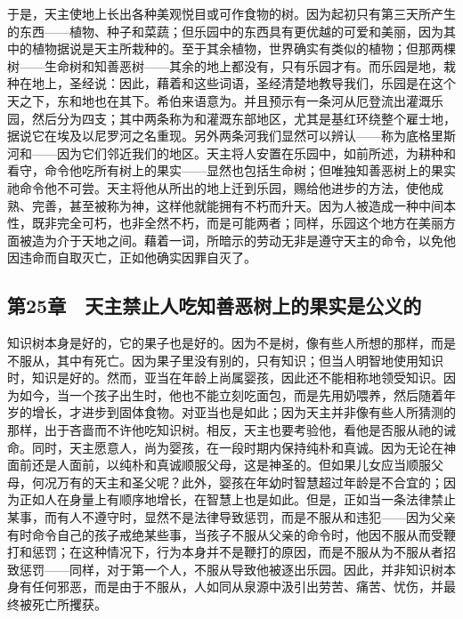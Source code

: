 于是，天主使地上长出各种美观悦目或可作食物的树。因为起初只有第三天所产生的东西——植物、种子和菜蔬；但乐园中的东西具有更优越的可爱和美丽，因为其中的植物据说是天主所栽种的。至于其余植物，世界确实有类似的植物；但那两棵树——生命树和知善恶树——其余的地上都没有，只有乐园才有。而乐园是地，栽种在地上，圣经说：因此，藉着和这些词语，圣经清楚地教导我们，乐园是在这个天之下，东和地也在其下。希伯来语意为。并且预示有一条河从厄登流出灌溉乐园，然后分为四支；其中两条称为和灌溉东部地区，尤其是基红环绕整个雇士地，据说它在埃及以尼罗河之名重现。另外两条河我们显然可以辨认——称为底格里斯河和——因为它们邻近我们的地区。天主将人安置在乐园中，如前所述，为耕种和看守，命令他吃所有树上的果实——显然也包括生命树；但唯独知善恶树上的果实祂命令他不可尝。天主将他从所出的地上迁到乐园，赐给他进步的方法，使他成熟、完善，甚至被称为神，这样他就能拥有不朽而升天。因为人被造成一种中间本性，既非完全可朽，也非全然不朽，而是可能两者；同样，乐园这个地方在美丽方面被造为介于天地之间。藉着一词，所暗示的劳动无非是遵守天主的命令，以免他因违命而自取灭亡，正如他确实因罪自灭了。\par


\subsection{第25章　天主禁止人吃知善恶树上的果实是公义的}

知识树本身是好的，它的果子也是好的。因为不是树，像有些人所想的那样，而是不服从，其中有死亡。因为果子里没有别的，只有知识；但当人明智地使用知识时，知识是好的。然而，亚当在年龄上尚属婴孩，因此还不能相称地领受知识。因为如今，当一个孩子出生时，他也不能立刻吃面包，而是先用奶喂养，然后随着年岁的增长，才进步到固体食物。对亚当也是如此；因为天主并非像有些人所猜测的那样，出于吝啬而不许他吃知识树。相反，天主也要考验他，看他是否服从祂的诫命。同时，天主愿意人，尚为婴孩，在一段时期内保持纯朴和真诚。因为无论在神面前还是人面前，以纯朴和真诚顺服父母，这是神圣的。但如果儿女应当顺服父母，何况万有的天主和圣父呢？此外，婴孩在年幼时智慧超过年龄是不合宜的；因为正如人在身量上有顺序地增长，在智慧上也是如此。但是，正如当一条法律禁止某事，而有人不遵守时，显然不是法律导致惩罚，而是不服从和违犯——因为父亲有时命令自己的孩子戒绝某些事，当孩子不服从父亲的命令时，他因不服从而受鞭打和惩罚；在这种情况下，行为本身并不是鞭打的原因，而是不服从为不服从者招致惩罚——同样，对于第一个人，不服从导致他被逐出乐园。因此，并非知识树本身有任何邪恶，而是由于不服从，人如同从泉源中汲引出劳苦、痛苦、忧伤，并最终被死亡所攫获。\par

